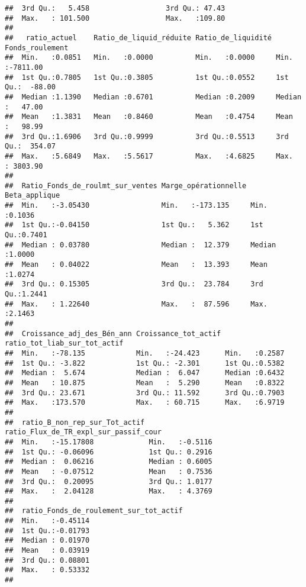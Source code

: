 \documentclass[
]{article}
\begin{document}
\begin{verbatim}
##  3rd Qu.:   5.458                  3rd Qu.: 47.43               
##  Max.   : 101.500                  Max.   :109.80               
##                                                                 
##   ratio_actuel    Ratio_de_liquid_réduite Ratio_de_liquidité Fonds_roulement   
##  Min.   :0.0851   Min.   :0.0000          Min.   :0.0000     Min.   :-7811.00  
##  1st Qu.:0.7805   1st Qu.:0.3805          1st Qu.:0.0552     1st Qu.:  -88.00  
##  Median :1.1390   Median :0.6701          Median :0.2009     Median :   47.00  
##  Mean   :1.3831   Mean   :0.8460          Mean   :0.4754     Mean   :   98.99  
##  3rd Qu.:1.6906   3rd Qu.:0.9999          3rd Qu.:0.5513     3rd Qu.:  354.07  
##  Max.   :5.6849   Max.   :5.5617          Max.   :4.6825     Max.   : 3803.90  
##                                                                                
##  Ratio_Fonds_de_roulmt_sur_ventes Marge_opérationnelle Beta_applique   
##  Min.   :-3.05430                 Min.   :-173.135     Min.   :0.1036  
##  1st Qu.:-0.04150                 1st Qu.:   5.362     1st Qu.:0.7401  
##  Median : 0.03780                 Median :  12.379     Median :1.0000  
##  Mean   : 0.04022                 Mean   :  13.393     Mean   :1.0274  
##  3rd Qu.: 0.15305                 3rd Qu.:  23.784     3rd Qu.:1.2441  
##  Max.   : 1.22640                 Max.   :  87.596     Max.   :2.1463  
##                                                                        
##  Croissance_adj_des_Bén_ann Croissance_tot_actif ratio_tot_liab_sur_tot_actif
##  Min.   :-78.135            Min.   :-24.423      Min.   :0.2587              
##  1st Qu.: -3.822            1st Qu.: -2.301      1st Qu.:0.5382              
##  Median :  5.674            Median :  6.047      Median :0.6432              
##  Mean   : 10.875            Mean   :  5.290      Mean   :0.8322              
##  3rd Qu.: 23.671            3rd Qu.: 11.592      3rd Qu.:0.7903              
##  Max.   :173.570            Max.   : 60.715      Max.   :6.9719              
##                                                                              
##  ratio_B_non_rep_sur_Tot_actif ratio_Flux_de_TR_expl_sur_passif_cour
##  Min.   :-15.17808             Min.   :-0.5116                      
##  1st Qu.: -0.06096             1st Qu.: 0.2916                      
##  Median :  0.06216             Median : 0.6005                      
##  Mean   : -0.07512             Mean   : 0.7536                      
##  3rd Qu.:  0.20095             3rd Qu.: 1.0177                      
##  Max.   :  2.04128             Max.   : 4.3769                      
##                                                                     
##  ratio_Fonds_de_roulement_sur_tot_actif
##  Min.   :-0.45114                      
##  1st Qu.:-0.01793                      
##  Median : 0.01970                      
##  Mean   : 0.03919                      
##  3rd Qu.: 0.08801                      
##  Max.   : 0.53332                      
## 
\end{verbatim}
\end{document}
